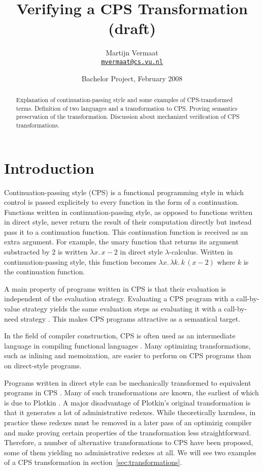 \documentclass[a4paper,11pt,draft]{article}
\title{\sffamily Verifying a CPS Transformation (draft)}
\author{\sffamily
  Martijn Vermaat\\[0.3em]
  \href{mailto:mvermaat@cs.vu.nl}{\texttt{mvermaat@cs.vu.nl}}
}
\date{\sffamily Bachelor Project, February 2008}
\begin{document}
\maketitle


\begin{abstract}
  Explanation of continuation-passing style and some examples of CPS-transformed
  terms. Definition of two languages and a transformation to CPS. Proving
  semantics preservation of the transformation. Discussion about mechanized
  verification of CPS transformations.
\end{abstract}


\section{Introduction}\label{sec:introduction}


Continuation-passing style (CPS) is a functional programming style in which control is
passed explicitely to every function in the form of a continuation. Functions
written in continuation-passing style, as opposed to functions written in direct
style, never return the result of their computation directly but instead pass it to a
continuation function. This continuation function is received as an extra argument.
For example, the unary function that returns its argument
substracted by $2$ is written $\lambda x. \, x - 2$ in direct style
$\lambda$-calculus. Written in continuation-passing style, this function becomes
$\lambda x. \, \lambda k. \, k \, (x - 2)$ where $k$ is the continuation function.

A main property of programs written in CPS is that their evaluation is independent
of the evaluation strategy. Evaluating a CPS program with a call-by-value strategy
yields the same evaluation steps as evaluating it with a call-by-need strategy
\cite{Plotkin-75}. This makes CPS programs attractive as a semantical target.

In the field of compiler construction, CPS is often used as an intermediate language
in compiling functional languages \cite{Appel-92,Orbit-86}. Many optimizing
transformations, such as inlining and memoization, are easier to perform on CPS
programs than on direct-style programs.

Programs written in direct style can be mechanically transformed to equivalent
programs in CPS \cite{Danvy-Filinski-92}. Many of such transformations are known,
the earliest of which is due to Plotkin \cite{Plotkin-75}. A major disadvantage of
Plotkin's original transformation is that it generates a lot of administrative redexes.
While theoretically harmless, in practice these redexes must be removed in a later
pass of an optimizig compiler and make proving certain properties of the transformation
less straightforward. Therefore, a number of alternative transformations to CPS have
been proposed, some of them yielding no administrative redexes at all. We will see two
examples of a CPS transformation in section~\ref{sec:transformations}.
\end{document}
